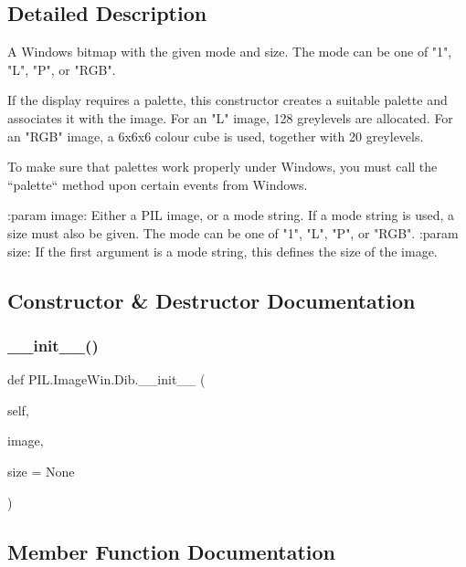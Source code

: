 \subsection{Detailed Description}
\begin{DoxyVerb}A Windows bitmap with the given mode and size.  The mode can be one of "1",
"L", "P", or "RGB".

If the display requires a palette, this constructor creates a suitable
palette and associates it with the image. For an "L" image, 128 greylevels
are allocated. For an "RGB" image, a 6x6x6 colour cube is used, together
with 20 greylevels.

To make sure that palettes work properly under Windows, you must call the
``palette`` method upon certain events from Windows.

:param image: Either a PIL image, or a mode string. If a mode string is
              used, a size must also be given.  The mode can be one of "1",
              "L", "P", or "RGB".
:param size: If the first argument is a mode string, this
             defines the size of the image.
\end{DoxyVerb}
 

\subsection{Constructor \& Destructor Documentation}
\mbox{\label{classPIL_1_1ImageWin_1_1Dib_af15ffb902fd5d195bf4cd089203eb4cd}} 
\subsubsection{\texorpdfstring{\+\_\+\+\_\+init\+\_\+\+\_\+()}{\_\_init\_\_()}}
{\footnotesize\ttfamily def P\+I\+L.\+Image\+Win.\+Dib.\+\_\+\+\_\+init\+\_\+\+\_\+ (\begin{DoxyParamCaption}\item[{}]{self,  }\item[{}]{image,  }\item[{}]{size = {\ttfamily None} }\end{DoxyParamCaption})}



\subsection{Member Function Documentation}
\mbox{\label{classPIL_1_1ImageWin_1_1Dib_a0f54b8802660ce056e50383d1a639dd7}} 
